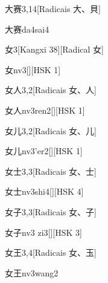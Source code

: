 \begin{entry}{大赛}{3,14}[Radicais ⼤、⾙]
  \begin{phonetics}{大赛}{da4sai4}
  \end{phonetics}
\end{entry}

\begin{entry}{女}{3}[Kangxi 38][Radical ⼥]
  \begin{phonetics}{女}{nv3}[][HSK 1]
  \end{phonetics}
\end{entry}

\begin{entry}{女人}{3,2}[Radicais ⼥、⼈]
  \begin{phonetics}{女人}{nv3ren2}[][HSK 1]
  \end{phonetics}
\end{entry}

\begin{entry}{女儿}{3,2}[Radicais ⼥、⼉]
  \begin{phonetics}{女儿}{nv3'er2}[][HSK 1]
  \end{phonetics}
\end{entry}

\begin{entry}{女士}{3,3}[Radicais ⼥、⼠]
  \begin{phonetics}{女士}{nv3shi4}[][HSK 4]
  \end{phonetics}
\end{entry}

\begin{entry}{女子}{3,3}[Radicais ⼥、⼦]
  \begin{phonetics}{女子}{nv3 zi3}[][HSK 3]
  \end{phonetics}
\end{entry}

\begin{entry}{女王}{3,4}[Radicais ⼥、⽟]
  \begin{phonetics}{女王}{nv3wang2}
  \end{phonetics}
\end{entry}

